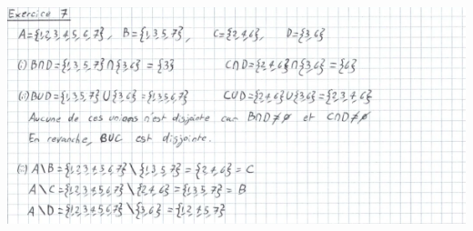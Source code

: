 \documentclass[a4paper, 10pt]{report}
\begin{document}
	\includegraphics{ex07.png}
	
\end{document}
